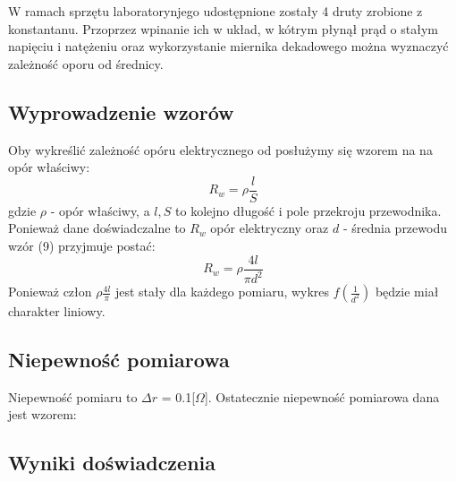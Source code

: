 \documentclass{article} %
\begin{document}
W ramach sprzętu laboratorynjego udostępnione zostały 4 druty zrobione z konstantanu. Przoprzez wpinanie ich w układ, w kótrym płynął prąd o stałym napięciu i natężeniu oraz wykorzystanie miernika dekadowego można wyznaczyć zależność oporu od średnicy.

\subsection{Wyprowadzenie wzorów}

Oby wykreślić zależność opóru elektrycznego od posłużymy się wzorem na na opór właściwy:
{\large
\begin{equation}
    R_w = \rho\frac{l}{S}
\end{equation}
}
gdzie $\rho$ - opór właściwy, a $l, S$ to kolejno długość i pole przekroju przewodnika. Ponieważ dane doświadczalne to $R_w$ opór elektryczny oraz $d$ - średnia przewodu wzór (9) przyjmuje postać:
{\large
\begin{equation}
    R_w = \rho\frac{4l}{\pi d^2}
\end{equation}
}
Ponieważ człon $\rho\frac{4l}{\pi}$ jest stały dla każdego pomiaru, wykres $f(\frac{1}{d^2})$ będzie miał charakter liniowy.
\subsection{Niepewność pomiarowa}

Niepewność pomiaru to $\Delta r$ = 0.1[$\Omega$].
Ostatecznie niepewność pomiarowa dana jest wzorem:

\subsection{Wyniki doświadczenia}
\end{document}
